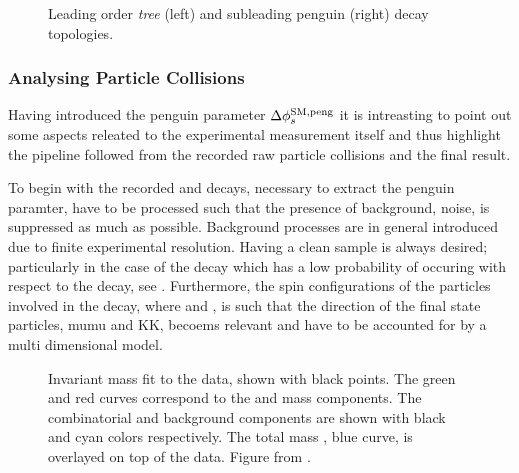 \begin{figure}[t]
  \begin{subfigure}{0.5\textwidth}
    \raggedright
    {\scalebox{1}{\sffamily }}
    \label{app_jpsiphi_tree}
  \end{subfigure}%
  \hfill
  \begin{subfigure}{0.5\textwidth}
    \raggedleft
    {\scalebox{1}{\sffamily }}
    \label{app_jpsiphi_peng}
  \end{subfigure}
    \caption{Leading order {\it tree} (left) and subleading penguin (right) \BsJpsiPhi decay topologies.}
  \label{app_jpsiphi_tree_peng}
\end{figure}

\subsubsection{Analysing Particle Collisions}
Having introduced the penguin parameter $\Delta\phi_{s}^{\tiny\text{SM,peng}}$ it is intreasting to point out some
aspects releated to the experimental measurement itself and thus highlight the pipeline followed from
the recorded raw particle collisions and the final result.

To begin with the recorded \BsJpsiKst and \BsJpsiRho decays, necessary to extract the penguin paramter,
have to be processed such that the presence of background, noise, is suppressed as much as possible.
Background processes are in general introduced due to finite experimental resolution. Having a clean
sample is always desired; particularly in the case of the \BsJpsiKst decay which has a low probability
of occuring with respect to the \BdJpsiKst decay, see . Furthermore, the spin
configurations of the particles involved in the \BsJpsiPhi decay, where \Jpsimumu and \phiKK, is such
that the direction of the final state particles, mumu and KK, becoems relevant and have to be accounted
for by a multi dimensional model.

\begin{figure}[t]
  \centering
  \scalebox{0.5}{}
  \caption{Invariant mass fit to the data, shown with black points. The green and red curves correspond to the \BdJpsiKst and
           \BsJpsiKst mass \pdf components. The combinatorial and \LbJpsippi background components are shown with black and cyan
           colors respectively. The total mass \pdf, blue curve, is overlayed on top of the data. Figure from \cite{bsjpsikst-paper}. }
  \label{app_mass_plot}
\end{figure}

